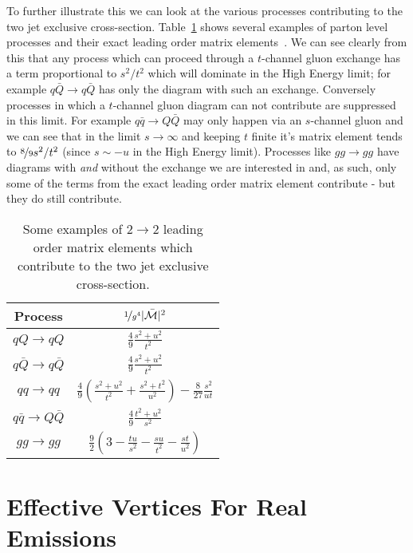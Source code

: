 	To further illustrate this we can look at the various processes contributing to the two
	jet exclusive cross-section.  Table~\ref{tab:LOatHE} shows several examples of parton level
	processes and their exact leading order matrix elements~\cite{pinkBook}.  We can see clearly
	from this that any process which can proceed through a $t$-channel gluon exchange has a term
	proportional to $s^2/t^2$ which will dominate in the High Energy limit; for
	example $q\bar{Q}\to q\bar{Q}$ has only the diagram with such an exchange.
	Conversely processes in which a $t$-channel gluon diagram can not contribute are
	suppressed in this limit.  For example $q\bar{q}\to Q\bar{Q}$ may only happen via an
	$s$-channel gluon and we can see that in the limit $s\to\infty$ and keeping $t$ finite it's matrix
	element tends to $\nicefrac{8}{9}s^2/t^2$ (since $s\sim-u$ in the High Energy limit).  Processes
	like $gg\to gg$ have diagrams with \emph{and} without the exchange we are interested in
	and, as such, only some of the terms from the exact leading order matrix element
	contribute - but they do still contribute.

	\begin{table}[hbt!]
		\begin{center}
		\begin{tabular}{c | c }
		Process                 & $\nicefrac{1}{g^4}|\bar{\mathcal{M}}|^2$ \\ \hline
		$qQ\to qQ$              & $\frac{4}{9}\frac{s^2 + u^2}{t^2}$       \\
		$q\bar{Q}\to q\bar{Q}$  & $\frac{4}{9}\frac{s^2 + u^2}{t^2}$       \\
		$qq\to qq$              & $\frac{4}{9}\left(\frac{s^2 + u^2}{t^2} + \frac{s^2 + t^2}{u^2}\right) - \frac{8}{27}\frac{s^2}{ut}$\\
		$q\bar{q}\to Q\bar{Q}$  & $\frac{4}{9}\frac{t^2 + u^2}{s^2}$       \\
		$gg\to gg$              & $\frac{9}{2}\left(3-\frac{tu}{s^2}-\frac{su}{t^2}-\frac{st}{u^2}\right)$\\
		\end{tabular}
		\caption{Some examples of $2\to2$ leading order matrix elements which contribute to the
		two jet exclusive cross-section.}
		\label{tab:LOatHE}
		\end{center}
	\end{table}

\section{Effective Vertices For Real Emissions}
	\label{sec:effectiveVertices}

